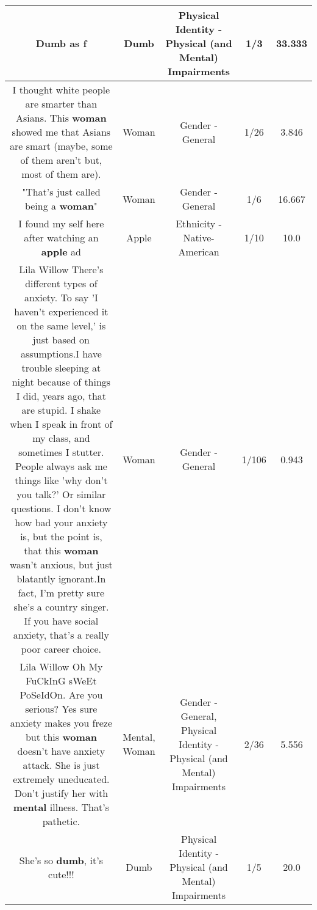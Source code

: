\documentclass[11pt]{article}
\newlength\mylength
\begin{document}
\begin{center}
\begin{longtable}{|C{.65\mylength}|C{.30\mylength}|C{.12\mylength}|C{.12\mylength}|C{.12\mylength}|}
  \small Dumb as f\normalsize   & Dumb & Physical Identity - Physical (and Mental) Impairments & 1/3 & 33.333 \\  \hline
  \small I thought white people are smarter than Asians. This \textbf{woman} showed me that Asians are smart (maybe, some of them aren't but, most of them are).\normalsize   & Woman & Gender - General & 1/26 & 3.846 \\  \hline
  \small "That's just called being a \textbf{woman}"\normalsize   & Woman & Gender - General & 1/6 & 16.667 \\  \hline
  \small I found my self here after watching an \textbf{apple} ad\normalsize   & Apple & Ethnicity - Native-American & 1/10 & 10.0 \\  \hline
  \small Lila Willow There's different types of anxiety. To say 'I haven't experienced it on the same level,' is just based on assumptions.I have trouble sleeping at night because of things I did, years ago, that are stupid. I shake when I speak in front of my class, and sometimes I stutter. People always ask me things like 'why don't you talk?' Or similar questions. I don't know how bad your anxiety is, but the point is, that this \textbf{woman} wasn't anxious, but just blatantly ignorant.In fact, I'm pretty sure she's a country singer. If you have social anxiety, that's a really poor career choice.\normalsize   & Woman & Gender - General & 1/106 & 0.943 \\  \hline
  \small Lila Willow Oh My FuCkInG sWeEt PoSeIdOn. Are you serious? Yes sure anxiety makes you freze but this \textbf{woman} doesn't have anxiety attack. She is just extremely uneducated. Don't justify her with \textbf{mental} illness. That's pathetic.\normalsize   & Mental, Woman & Gender - General, Physical Identity - Physical (and Mental) Impairments & 2/36 & 5.556 \\  \hline
  \small She's so \textbf{dumb}, it's cute!!!\normalsize   & Dumb & Physical Identity - Physical (and Mental) Impairments & 1/5 & 20.0 \\  \hline

\end{longtable}
\end{center}
\end{document}
